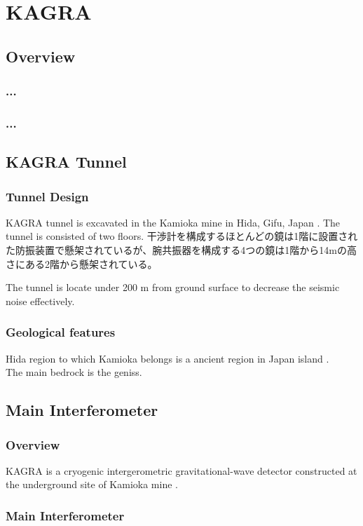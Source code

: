 \chapter{KAGRA}
\section{Overview}
\subsection{...}
\subsection{...}
\section{KAGRA Tunnel}
\subsection{Tunnel Design}
KAGRA tunnel is excavated in the Kamioka mine in Hida, Gifu, Japan \cite{uchiyama2014excavation}. The tunnel is consisted of two floors.
干渉計を構成するほとんどの鏡は1階に設置された防振装置で懸架されているが、腕共振器を構成する4つの鏡は1階から14mの高さにある2階から懸架されている。

The tunnel is locate under 200 m from ground surface to decrease the seismic noise effectively.


\subsection{Geological features}

Hida region to which Kamioka belongs is a ancient region in Japan island \cite{Isozaki2010new}. 
\\

The main bedrock is the geniss. 

\section{Main Interferometer}
\subsection{Overview}
KAGRA is a cryogenic intergerometric gravitational-wave detector constructed at the underground site of Kamioka mine \cite{akutsu2017construction}.


\subsection{Main Interferometer}
